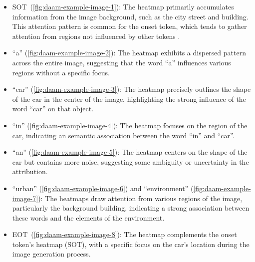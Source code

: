 \begin{itemize}
\item \textlangle SOT\textrangle\ (\ref{fig:daam-example-image-1}): The heatmap primarily accumulates information from the image background, such as the city street and building. This attention pattern is common for the onset token, which tends to gather attention from regions not influenced by other tokens \cite{DAAM}.
\item ``a'' (\ref{fig:daam-example-image-2}): The heatmap exhibits a dispersed pattern across the entire image, suggesting that the word ``a'' influences various regions without a specific focus.
\item ``car'' (\ref{fig:daam-example-image-3}): The heatmap precisely outlines the shape of the car in the center of the image, highlighting the strong influence of the word ``car'' on that object.
\item ``in'' (\ref{fig:daam-example-image-4}): The heatmap focuses on the region of the car, indicating an semantic association between the word ``in'' and ``car''.
\item ``an'' (\ref{fig:daam-example-image-5}): The heatmap centers on the shape of the car but contains more noise, suggesting some ambiguity or uncertainty in the attribution.
\item ``urban'' (\ref{fig:daam-example-image-6}) and ``environment'' (\ref{fig:daam-example-image-7}): The heatmaps draw attention from various regions of the image, particularly the background building, indicating a strong association between these words and the elements of the environment.
\item \textlangle EOT\textrangle\ (\ref{fig:daam-example-image-8}): The heatmap complements the onset token's heatmap (\textlangle SOT\textrangle), with a specific focus on the car's location during the image generation process.
\end{itemize}



